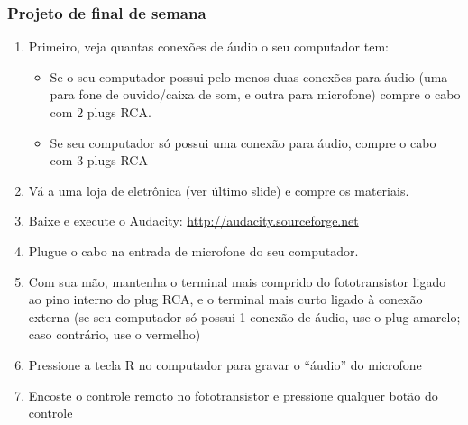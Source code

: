 \documentclass{beamer}
\begin{document}
\begin{frame}
\frametitle{Projeto de final de semana}

{\small
\begin{enumerate}
\item Primeiro, veja quantas conexões de áudio o seu computador tem:
\begin{itemize}
\item Se o seu computador possui pelo menos duas conexões
para áudio (uma para fone de ouvido/caixa de som, e outra para
microfone) compre o cabo com $2$ plugs RCA.
\item Se seu computador só possui uma conexão para áudio,
compre o cabo com $3$ plugs RCA
\end{itemize}
\pause
\item Vá a uma loja de eletrônica (ver último slide) e compre os materiais.
\pause
\item Baixe e execute o Audacity: \url{http://audacity.sourceforge.net}
\pause
\item Plugue o cabo na entrada de microfone do seu computador.
\pause
\item Com sua mão, mantenha o terminal mais comprido do fototransistor
ligado ao pino interno do plug RCA, e o terminal mais curto ligado à conexão
externa (se seu computador só possui 1 conexão de áudio, use o plug amarelo;
caso contrário, use o vermelho)
\pause
\item Pressione a tecla R no computador para gravar o ``áudio'' do microfone
\pause
\item Encoste o controle remoto no fototransistor e pressione qualquer
botão do controle
\end{enumerate}
}
\end{frame}

\end{document}
